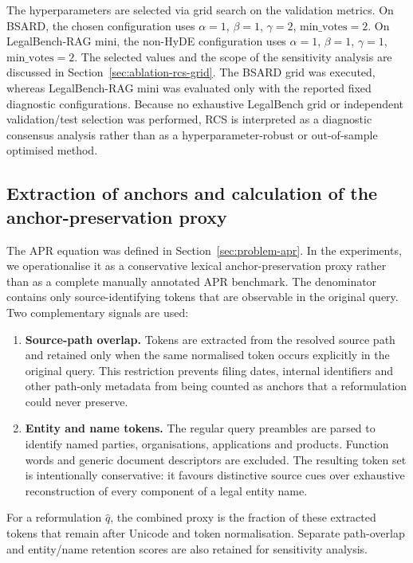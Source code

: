 \documentclass[a4paper,fleqn]{cas-dc}
\begin{document}
The hyperparameters are selected via grid search on 
the validation metrics. On BSARD, the chosen configuration 
uses $\alpha = 1$, $\beta = 1$, $\gamma = 2$, $\text{min\_votes} 
= 2$. On LegalBench-RAG mini, the non-HyDE configuration uses 
$\alpha = 1$, $\beta = 1$, $\gamma = 1$, $\text{min\_votes} = 2$. 
The selected values and the scope of the sensitivity analysis are
discussed in Section~\ref{sec:ablation-rcs-grid}. The BSARD grid was
executed, whereas LegalBench-RAG mini was evaluated only with the
reported fixed diagnostic configurations. Because no exhaustive
LegalBench grid or independent validation/test selection was performed,
RCS is interpreted as a diagnostic consensus analysis rather than as a
hyperparameter-robust or out-of-sample optimised method.

\subsection{Extraction of anchors and calculation of the anchor-preservation proxy}
\label{sec:anchor-extraction}

The APR equation was defined in Section~\ref{sec:problem-apr}. In the
experiments, we operationalise it as a conservative lexical
anchor-preservation proxy rather than as a complete manually annotated
APR benchmark. The denominator contains only source-identifying tokens
that are observable in the original query. Two complementary signals
are used:

\begin{enumerate}
    \item \textbf{Source-path overlap.} Tokens are extracted from the
    resolved source path and retained only when the same normalised token
    occurs explicitly in the original query. This restriction prevents
    filing dates, internal identifiers and other path-only metadata from
    being counted as anchors that a reformulation could never preserve.

    \item \textbf{Entity and name tokens.} The regular query preambles are
    parsed to identify named parties, organisations, applications and
    products. Function words and generic document descriptors are excluded.
    The resulting token set is intentionally conservative: it favours
    distinctive source cues over exhaustive reconstruction of every
    component of a legal entity name.
\end{enumerate}

For a reformulation $\hat{q}$, the combined proxy is the fraction of
these extracted tokens that remain after Unicode and token
normalisation. Separate path-overlap and entity/name retention scores
are also retained for sensitivity analysis.
\end{document}
